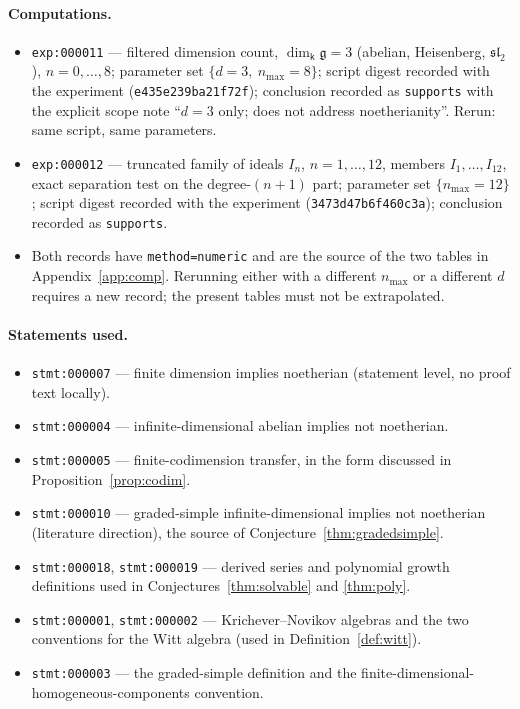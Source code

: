 \documentclass[11pt]{ctexart}
\theoremstyle{plain}
\theoremstyle{definition}
\theoremstyle{remark}
\newcommand{\kk}{\mathsf{k}}
\newcommand{\gl}{\mathfrak{g}}
\begin{document}
\paragraph{Computations.}
\begin{itemize}
\item \texttt{exp:000011} --- filtered dimension count, $\dim_\kk\gl=3$ (abelian,
Heisenberg, $\mathfrak{sl}_2$), $n=0,\dots,8$; parameter set
$\{d=3,\ n_{\max}=8\}$; script digest recorded with the experiment
(\texttt{e435e239ba21f72f}); conclusion recorded as \texttt{supports} with the explicit
scope note ``$d=3$ only; does not address noetherianity''. Rerun: same script, same
parameters.
\item \texttt{exp:000012} --- truncated family of ideals $I_n$, $n=1,\dots,12$,
members $I_1,\dots,I_{12}$, exact separation test on the degree-$(n{+}1)$ part;
parameter set $\{n_{\max}=12\}$; script digest recorded with the experiment
(\texttt{3473d47b6f460c3a}); conclusion recorded as \texttt{supports}.
\item Both records have \texttt{method=numeric} and are the source of the two tables in
Appendix~\ref{app:comp}. Rerunning either with a different $n_{\max}$ or a different
$d$ requires a new record; the present tables must not be extrapolated.
\end{itemize}

\paragraph{Statements used.}
\begin{itemize}
\item \texttt{stmt:000007} --- finite dimension implies noetherian (statement level,
no proof text locally).
\item \texttt{stmt:000004} --- infinite-dimensional abelian implies not noetherian.
\item \texttt{stmt:000005} --- finite-codimension transfer, in the form discussed in
Proposition~\ref{prop:codim}.
\item \texttt{stmt:000010} --- graded-simple infinite-dimensional implies not
noetherian (literature direction), the source of Conjecture~\ref{thm:gradedsimple}.
\item \texttt{stmt:000018}, \texttt{stmt:000019} --- derived series and polynomial
growth definitions used in Conjectures~\ref{thm:solvable} and \ref{thm:poly}.
\item \texttt{stmt:000001}, \texttt{stmt:000002} --- Krichever--Novikov algebras and
the two conventions for the Witt algebra (used in Definition~\ref{def:witt}).
\item \texttt{stmt:000003} --- the graded-simple definition and the
finite-dimensional-homogeneous-components convention.
\end{itemize}
\end{document}
